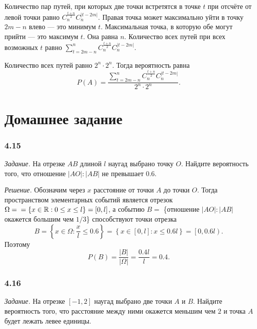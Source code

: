 Количество пар путей, при которых две точки встретятся в точке $t$ при отсчёте от левой точки равно $C_n^{ \frac{t+n}{2} } C_n^{ \left| t-2m \right| }$.
Правая точка может максимально уйти в точку $2m - n$ влево --- это минимум $t$.
Максимальная точка, в которую обе могут прийти --- это максимум $t$.
Она равна $n$.
Количество всех путей при всех возможных $t$ равно $ \sum \limits_{t=2m-n}^n C_n^{ \frac{t+n}{2} } C_n^{ \left| t-2m \right| }$.

Количество всех путей равно $2^n \cdot 2^n$.
Тогда вероятность равна
$$P \left( A \right) =
\frac{ \sum \limits_{t=2m-n}^n C_n^{ \frac{t+n}{2} } C_n^{ \left| t-2m \right| }}{2^n \cdot 2^n}.$$

\section*{Домашнее задание}

\subsubsection*{4.15}

\textit{Задание.} На отрезке $AB$ длиной $l$ наугад выбрано точку $O$.
Найдите вероятность того, что отношение $|AO|:|AB|$ не превышает $0.6$.

\textit{Решение.} Обозначим через $x$ расстояние от точки $A$ до точки $O$.
Тогда пространством элементарных событий является отрезок
$ \Omega = \\
= \left\{ x \in \mathbb{R}: 0 \leq x \leq l \right\} =
\left[ 0, l \right] $,
а событию $B = $ 
\{отношение $|AO|:|AB|$ окажется большим чем $1/3$\}
способствуют точки отрезка
$$B =
\left\{ x \in \Omega : \frac{x}{l} \leq 0.6 \right\} =
\left\{ x \in \left[ 0, l \right] : x \leq 0.6 l \right\} =
\left[ 0, 0.6 l \right).$$
Поэтому
$$P \left( B \right) =
\frac{|B|}{| \Omega |} =
\frac{0.4 l}{l} =
0.4.$$

\subsubsection*{4.16}

\textit{Задание.} На отрезке $ \left[ -1, 2 \right] $ наугад выбрано две точки $A$ и $B$.
Найдите вероятность того, что расстояние между ними окажется меньшим чем $2$ и точка $A$ будет лежать левее единицы.

